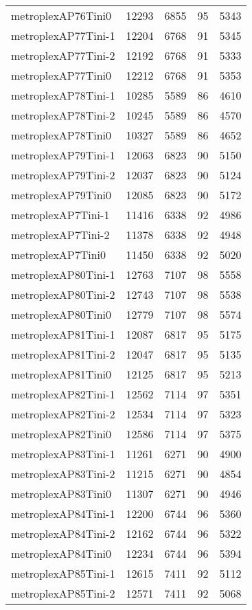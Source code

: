 \begin{longtable}{lrrrr}
metroplexAP76Tini0 & 12293 & 6855 & 95 & 5343 \\
metroplexAP77Tini-1 & 12204 & 6768 & 91 & 5345 \\
metroplexAP77Tini-2 & 12192 & 6768 & 91 & 5333 \\
metroplexAP77Tini0 & 12212 & 6768 & 91 & 5353 \\
metroplexAP78Tini-1 & 10285 & 5589 & 86 & 4610 \\
metroplexAP78Tini-2 & 10245 & 5589 & 86 & 4570 \\
metroplexAP78Tini0 & 10327 & 5589 & 86 & 4652 \\
metroplexAP79Tini-1 & 12063 & 6823 & 90 & 5150 \\
metroplexAP79Tini-2 & 12037 & 6823 & 90 & 5124 \\
metroplexAP79Tini0 & 12085 & 6823 & 90 & 5172 \\
metroplexAP7Tini-1 & 11416 & 6338 & 92 & 4986 \\
metroplexAP7Tini-2 & 11378 & 6338 & 92 & 4948 \\
metroplexAP7Tini0 & 11450 & 6338 & 92 & 5020 \\
metroplexAP80Tini-1 & 12763 & 7107 & 98 & 5558 \\
metroplexAP80Tini-2 & 12743 & 7107 & 98 & 5538 \\
metroplexAP80Tini0 & 12779 & 7107 & 98 & 5574 \\
metroplexAP81Tini-1 & 12087 & 6817 & 95 & 5175 \\
metroplexAP81Tini-2 & 12047 & 6817 & 95 & 5135 \\
metroplexAP81Tini0 & 12125 & 6817 & 95 & 5213 \\
metroplexAP82Tini-1 & 12562 & 7114 & 97 & 5351 \\
metroplexAP82Tini-2 & 12534 & 7114 & 97 & 5323 \\
metroplexAP82Tini0 & 12586 & 7114 & 97 & 5375 \\
metroplexAP83Tini-1 & 11261 & 6271 & 90 & 4900 \\
metroplexAP83Tini-2 & 11215 & 6271 & 90 & 4854 \\
metroplexAP83Tini0 & 11307 & 6271 & 90 & 4946 \\
metroplexAP84Tini-1 & 12200 & 6744 & 96 & 5360 \\
metroplexAP84Tini-2 & 12162 & 6744 & 96 & 5322 \\
metroplexAP84Tini0 & 12234 & 6744 & 96 & 5394 \\
metroplexAP85Tini-1 & 12615 & 7411 & 92 & 5112 \\
metroplexAP85Tini-2 & 12571 & 7411 & 92 & 5068 \\

\end{longtable}
